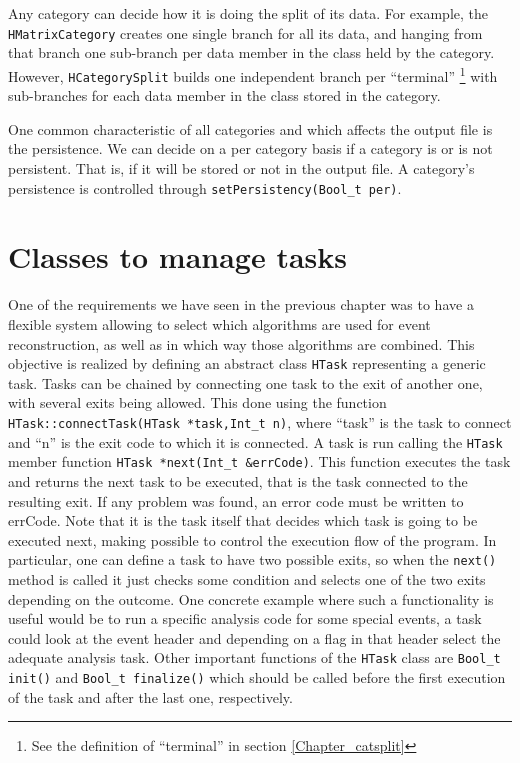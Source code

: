 Any category can decide how it is doing the split of its data. For example, the 
\verb+HMatrixCategory+ creates one single branch for all its data, and hanging from 
that branch one sub-branch per data member in the class held by the category. However, 
\verb+HCategorySplit+ builds one independent branch per ``terminal'' 
\footnote{See the definition of ``terminal'' in section \ref{Chapter_catsplit} } with 
sub-branches for each data member in the class stored in the category.

One common characteristic of all categories and which affects the output file is the 
persistence. We can decide on a per category basis if a category is or is not persistent. 
That is, if it will be stored or not in the output file. A category's persistence is 
controlled through \verb+setPersistency(Bool_t per)+. 


\section{Classes to manage tasks}

One of the requirements we have seen in the previous chapter was to have a flexible system 
allowing to select which algorithms are used for event reconstruction, as well as in which 
way those algorithms are combined.
This objective is realized by defining an abstract class \verb+HTask+ representing a 
generic task. Tasks can be chained by connecting one task to the exit of another one, 
with several exits being allowed. This done using the function 
\verb+HTask::connectTask(HTask *task,Int_t n)+, where ``task'' is the task to connect 
and ``n'' is the exit code to which it is connected.
A task is run calling the \verb+HTask+ member function \verb+HTask *next(Int_t &errCode)+. 
This function executes the task and returns the next task to be executed, that is the 
task connected to the resulting exit. If any problem was found, an error code must be 
written to errCode. Note that it is the task itself that decides which task is going 
to be executed next, making possible to control the execution flow of the program. 
In particular, one can define a task to have two possible exits, so when the \verb+next()+ 
method is called it just checks some condition and selects one of the two exits 
depending on the outcome. One concrete example where such a functionality is useful 
would be to run a specific analysis code for some special events, a task could 
look at the event header and depending on a flag in that header select the adequate 
analysis task.
Other important functions of the \verb+HTask+ class are \verb+Bool_t init()+ and 
\verb+Bool_t finalize()+ which should be called before the first execution of the task 
and after the last one, respectively.

